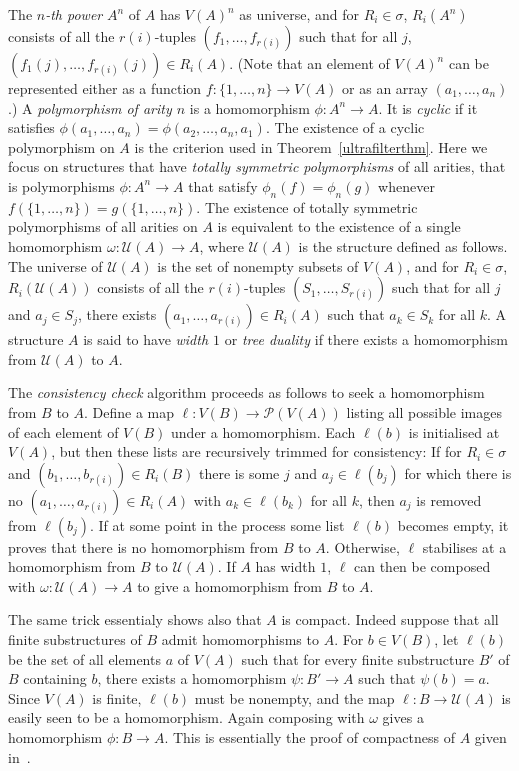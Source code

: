 \documentclass{lmcs}
\begin{document}
The {\em $n$-th power} $A^n$ of $A$ has $V(A)^n$ as universe, and
for $R_i \in \sigma$, $R_i(A^n)$ consists of all the $r(i)$-tuples $(f_1, \ldots, f_{r(i)})$
such that for all $j$, $(f_1(j), \ldots, f_{r(i)}(j)) \in R_i(A)$. (Note that an element
of $V(A)^n$ can be represented either as a function $f: \{1, \ldots, n\} \rightarrow V(A)$
 or as an array $(a_1, \ldots, a_n)$.)
A {\em polymorphism of arity $n$} is a homomorphism $\phi: A^n \rightarrow A$.
It is {\em cyclic} if it satisfies $\phi(a_1, \ldots, a_n) = \phi(a_2, \ldots, a_n, a_1)$.
The existence of a cyclic polymorphism on $A$ is the criterion
used in Theorem~\ref{ultrafilterthm}. Here we focus on structures that have {\em totally symmetric polymorphisms}
of all arities, that is polymorphisms $\phi: A^n \rightarrow A$ that satisfy
$\phi_n(f) = \phi_n(g)$ whenever $f(\{1, \ldots, n\}) = g(\{1, \ldots, n\})$. 
The existence of totally symmetric polymorphisms of all arities on $A$ is equivalent
to the existence of a single homomorphism $\omega: \mathcal{U}(A) \rightarrow A$, where 
$\mathcal{U}(A)$ is the structure defined as follows. The
universe of $\mathcal{U}(A)$ is the set of nonempty subsets of $V(A)$, and for 
$R_i \in \sigma$, $R_i(\mathcal{U}(A))$ consists of all
the $r(i)$-tuples $(S_1, \ldots, S_{r(i)})$ such that for all $j$ and $a_j \in S_j$, there exists
$(a_1, \ldots, a_{r(i)}) \in R_i(A)$ such that $a_k \in S_k$ for all $k$.
A structure $A$ is said to have {\em width $1$} or {\em tree duality} if there
exists a homomorphism from $\mathcal{U}(A)$ to $A$.

The {\em consistency check} algorithm proceeds as follows to seek a homomorphism from $B$ to $A$.
Define a map $\ell: V(B) \rightarrow \mathcal{P}(V(A))$ listing all possible images of
each element of $V(B)$ under a homomorphism. Each $\ell(b)$ is initialised at $V(A)$, but then these lists 
are recursively trimmed for consistency: If for $R_i \in \sigma$ and $(b_1, \ldots, b_{r(i)}) \in R_i(B)$
there is some $j$ and $a_j \in \ell(b_j)$ for which there is no $(a_1, \ldots, a_{r(i)}) \in R_i(A)$
with $a_k \in \ell(b_k)$ for all $k$, then $a_j$ is removed from $\ell(b_j)$. If at some point in the process
some list $\ell(b)$ becomes empty, it proves that there is no homomorphism from $B$ to $A$. Otherwise,
$\ell$ stabilises at a homomorphism from $B$ to $\mathcal{U}(A)$. If $A$ has width $1$,
$\ell$ can then be composed with $\omega: \mathcal{U}(A) \rightarrow A$ to give a homomorphism
from $B$ to $A$.

The same trick essentialy shows also that $A$ is compact.
Indeed suppose that all finite substructures of $B$ admit homomorphisms to $A$. For $b \in V(B)$,
let $\ell(b)$ be the set of all elements $a$ of $V(A)$ such that for every finite substructure $B'$
of $B$ containing $b$, there exists a homomorphism $\psi: B' \rightarrow A$ such that $\psi(b) = a$.
Since $V(A)$ is finite, $\ell(b)$ must be nonempty, and the map $\ell: B \rightarrow \mathcal{U}(A)$
is easily seen to be a homomorphism. Again composing with $\omega$ gives a homomorphism $\phi: B \rightarrow A$.
This is essentially the proof of compactness of $A$ given in~\cite{rtw}.
\end{document}
